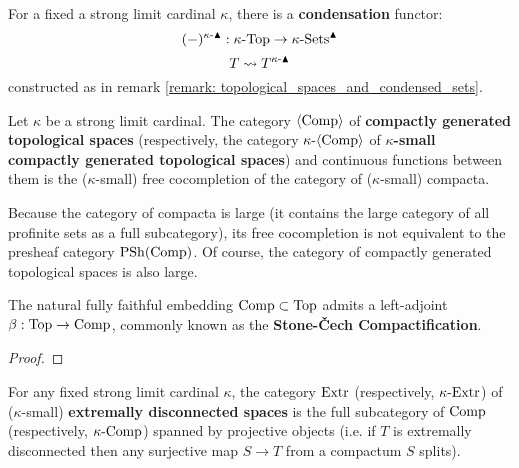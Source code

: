             \begin{definition}[Condensation] \label{def: condensation_of_topological_spaces}
                For a fixed a strong limit cardinal $\kappa$, there is a \textbf{condensation} functor:
                    $$(-)^{\kappa\text{-}\blacktriangle}: \kappa\text{-}\mathrm{Top} \to \kappa\text{-}\mathrm{Sets}^{\blacktriangle}$$
                    $$T \leadsto T^{\kappa\text{-}\blacktriangle}$$
                constructed as in remark \ref{remark: topological_spaces_and_condensed_sets}.
            \end{definition}
            \begin{definition} \label{def: compactly_generated_topological_spaces}
                Let $\kappa$ be a strong limit cardinal. The category $\langle\mathrm{Comp}\rangle$ of \textbf{compactly generated topological spaces} (respectively, the category $\kappa\text{-}\langle\mathrm{Comp}\rangle$ of \textbf{$\kappa$-small compactly generated topological spaces}) and continuous functions between them is the ($\kappa$-small) free cocompletion of the category of ($\kappa$-small) compacta. 
            \end{definition}
            \begin{remark}
                Because the category of compacta is large (it contains the large category of all profinite sets as a full subcategory), its free cocompletion is not equivalent to the presheaf category $\mathrm{PSh}(\mathrm{Comp})$. Of course, the category of compactly generated topological spaces is also large. 
            \end{remark}
            \begin{lemma} \label{lemma: the_stone_cech_compactification}
                The natural fully faithful embedding $\mathrm{Comp} \subset \mathrm{Top}$ admits a left-adjoint $\beta: \mathrm{Top} \to \mathrm{Comp}$, commonly known as the \textbf{Stone-\v{C}ech Compactification}.
            \end{lemma}
                \begin{proof}
                    
                \end{proof}
            \begin{definition} \label{def: extremally_disconnected_spaces}
                For any fixed strong limit cardinal $\kappa$, the category $\mathrm{Extr}$ (respectively, $\kappa\text{-}\mathrm{Extr}$) of ($\kappa$-small) \textbf{extremally disconnected spaces} is the full subcategory of $\mathrm{Comp}$ (respectively, $\kappa\text{-}\mathrm{Comp}$) spanned by projective objects (i.e. if $T$ is extremally disconnected then any surjective map $S \to T$ from a compactum $S$ splits). 
            \end{definition}
